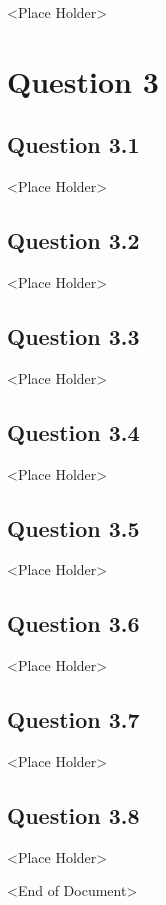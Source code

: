 \documentclass[parskip=full]{scrartcl}
\begin{document}
    <Place Holder>

    
\section*{Question 3}
    \subsection*{Question 3.1}
    
    <Place Holder>

    \subsection*{Question 3.2}
    
    <Place Holder>

    \subsection*{Question 3.3}
    
    <Place Holder>

    \subsection*{Question 3.4}
    
    <Place Holder>

    \subsection*{Question 3.5}
    
    <Place Holder>

    \subsection*{Question 3.6}
    
    <Place Holder>

    \subsection*{Question 3.7}
    
    <Place Holder>

    \subsection*{Question 3.8}
    
    <Place Holder>

    \begin{center}
        <End of Document>
    \end{center}
\end{document}
